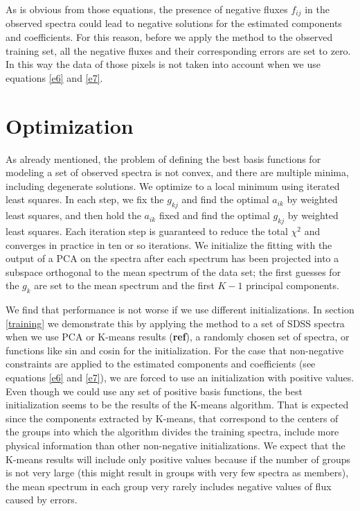 \documentclass[12pt,preprint]{aastex}
\begin{document}
As is obvious from those equations, the presence of negative fluxes $f_{ij}$ in the observed spectra could lead to negative solutions for the estimated components and coefficients. For this reason, before we apply the method to the observed training set, all the negative fluxes and their corresponding errors are set to zero. In this way the data of those pixels is not taken into account when we use equations \ref{e6} and \ref{e7}.

\section{Optimization}\label{optimization}
As already mentioned, the problem of defining the best basis functions for modeling a set of observed spectra is not convex, and there are multiple minima, including degenerate solutions. We optimize to a local minimum using iterated least squares. In each step, we fix the $g_{kj}$ and find the optimal $a_{ik}$ by weighted least squares, and then hold the $a_{ik}$ fixed and find the optimal $g_{kj}$ by weighted least squares. Each iteration step is guaranteed to reduce the total $\chi^2$ and converges in practice in ten or so iterations. We initialize the fitting with the output of a PCA on the spectra after each spectrum has been projected into a subspace orthogonal to the mean spectrum of the data set; the first guesses for the $g_{k}$ are set to the mean spectrum and the first $K-1$ principal components.

We find that performance is not worse if we use different initializations. In section \ref{training} we demonstrate this by applying the method to a set of SDSS spectra when we use PCA or K-means results (\textbf{ref}), a randomly chosen set of spectra, or functions like sin and cosin for the initialization. For the case that non-negative constraints are applied to the estimated components and coefficients (see equations \ref{e6} and \ref{e7}), we are forced to use an initialization with positive values. Even though we could use any set of positive basis functions, the best initialization seems to be the results of the K-means algorithm. That is expected since the components extracted by K-means, that correspond to the centers of the groups into which the algorithm divides the training spectra, include more physical information than other non-negative initializations. We expect that the K-means results will include only positive values because if the number of groups is not very large (this might result in groups with very few spectra as members), the mean spectrum in each group very rarely includes negative values of flux caused by errors.
\end{document}
